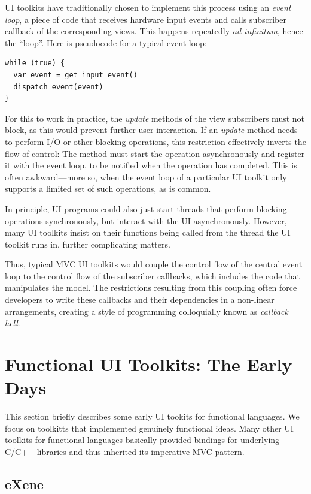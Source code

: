 \documentclass[sigplan,screen]{acmart}
\begin{document}
UI toolkits have traditionally chosen to implement this process using
an \textit{event loop}, a piece of code that receives hardware input
events and calls subscriber callback of the corresponding
views.  This happens repeatedly \textit{ad infinitum}, hence the
``loop''.  Here is pseudocode for a typical event loop:
%
\begin{verbatim}
while (true) {
  var event = get_input_event()
  dispatch_event(event)
}
\end{verbatim}
%
For this to work in practice, the \textit{update} methods of the view
subscribers must not block, as this would prevent further user
interaction.  If an \textit{update} method needs to perform I/O or
other blocking operations, this restriction effectively inverts the
flow of control: The method must start the operation asynchronously
and register it with the event loop, to be notified when the operation
has completed.  This is often awkward---more so, when the event loop
of a particular UI toolkit only supports a limited set of such
operations, as is common.

In principle, UI programs could also just start threads that perform
blocking operations synchronously, but interact with the UI
asynchronously.  However, many UI toolkits insist on their functions
being called from the thread the UI toolkit runs in, further
complicating matters.

Thus, typical MVC UI toolkits would couple the control flow of the
central event loop to the control flow of the subscriber callbacks,
which includes the code that manipulates the model.  The restrictions
resulting from this coupling often force developers to write these
callbacks and their dependencies in a non-linear arrangements,
creating a style of programming colloquially known as \textit{callback
  hell}.

\section{Functional UI Toolkits: The Early Days}
\label{sec:functional-ui}

This section briefly describes some early UI tookits for functional
languages.  We focus on toolkitts that implemented genuinely
functional ideas.  Many other UI toolkits for functional languages
basically provided bindings for underlying C/C++ libraries and thus
inherited its imperative MVC pattern.

\subsection{eXene}
\end{document}
